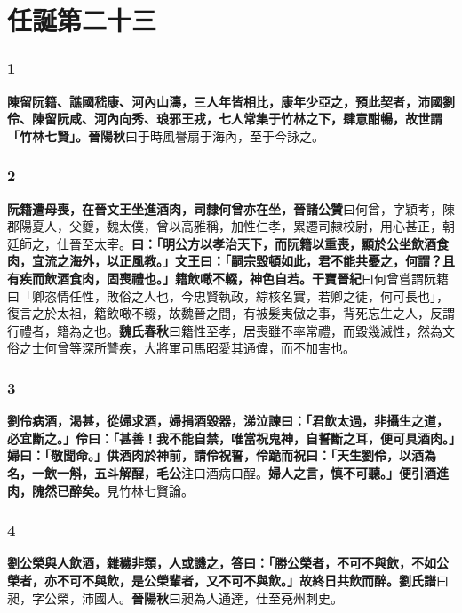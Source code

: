 \chapter{任誕第二十三}

\subsection*{1}

\textbf{陳留阮籍、譙國嵇康、河內山濤，三人年皆相比，康年少亞之，預此契者，沛國劉伶、陳留阮咸、河內向秀、琅邪王戎，七人常集于竹林之下，肆意酣暢，故世謂「竹林七賢」。}{\footnotesize \textbf{晉陽秋}曰于時風譽扇于海內，至于今詠之。}

\subsection*{2}

\textbf{阮籍遭母喪，在晉文王坐進酒肉，司隸何曾亦在坐，}{\footnotesize \textbf{晉諸公贊}曰何曾，字穎考，陳郡陽夏人，父夔，魏太僕，曾以高雅稱，加性仁孝，累遷司隸校尉，用心甚正，朝廷師之，仕晉至太宰。}\textbf{曰：「明公方以孝治天下，而阮籍以重喪，顯於公坐飲酒食肉，宜流之海外，以正風教。」文王曰：「嗣宗毀頓如此，君不能共憂之，何謂？且有疾而飲酒食肉，固喪禮也。」籍飲噉不輟，神色自若。}{\footnotesize \textbf{干寶晉紀}曰何曾嘗謂阮籍曰「卿恣情任性，敗俗之人也，今忠賢執政，綜核名實，若卿之徒，何可長也」，復言之於太祖，籍飲噉不輟，故魏晉之間，有被髮夷傲之事，背死忘生之人，反謂行禮者，籍為之也。\textbf{魏氏春秋}曰籍性至孝，居喪雖不率常禮，而毀幾滅性，然為文俗之士何曾等深所讐疾，大將軍司馬昭愛其通偉，而不加害也。}

\subsection*{3}

\textbf{劉伶病酒，渴甚，從婦求酒，婦捐酒毀器，涕泣諫曰：「君飲太過，非攝生之道，必宜斷之。」伶曰：「甚善！我不能自禁，唯當祝鬼神，自誓斷之耳，便可具酒肉。」婦曰：「敬聞命。」供酒肉於神前，請伶祝誓，伶跪而祝曰：「天生劉伶，以酒為名，一飲一斛，五斗解酲，}{\footnotesize \textbf{毛公}注曰酒病曰酲。}\textbf{婦人之言，慎不可聽。」便引酒進肉，隗然已醉矣。}{\footnotesize 見竹林七賢論。}

\subsection*{4}

\textbf{劉公榮與人飲酒，雜穢非類，人或譏之，答曰：「勝公榮者，不可不與飲，不如公榮者，亦不可不與飲，是公榮輩者，又不可不與飲。」故終日共飲而醉。}{\footnotesize \textbf{劉氏譜}曰昶，字公榮，沛國人。\textbf{晉陽秋}曰昶為人通達，仕至兗州刺史。}

